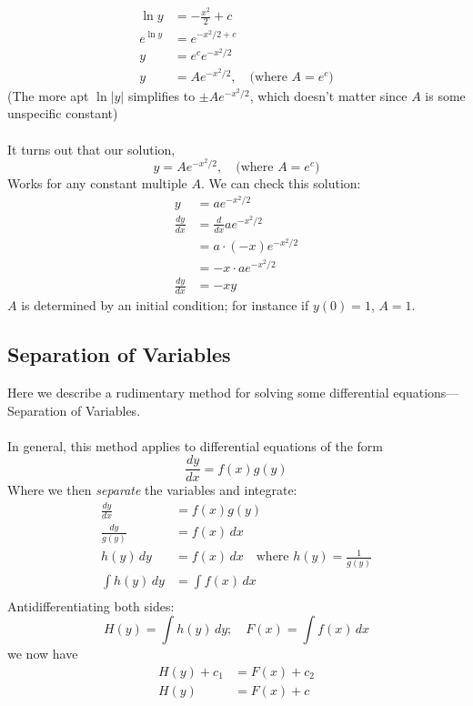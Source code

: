 \documentclass{report}
\begin{document}
\begin{align*}
\ln y&=-\frac{x^2}{2}+c\\
e^{\ln y}&=e^{-x^2/2+c}\\
y&=e^ce^{-x^2/2}\\
y&=Ae^{-x^2/2},\quad\text{(where $A=e^c$})
\end{align*}
(The more apt $\ln|y|$ simplifies to $\pm Ae^{-x^2/2}$, which doesn't matter since $A$ is some
unspecific constant)\\
\vspace{1mm}\\
It turns out that our solution,
\begin{equation*}
y=Ae^{-x^2/2},\quad\text{(where $A=e^c$})
\end{equation*}
Works for any constant multiple $A$. We can check this 
solution:
\begin{align*}
y&=ae^{-x^2/2}\\
\frac{dy}{dx}&=\frac{d}{dx}ae^{-x^2/2}\\
&=a\cdot(-x)e^{-x^2/2}\\
&=-x\cdot ae^{-x^2/2}\\
\frac{dy}{dx}&=-xy
\end{align*}
$A$ is determined by an initial condition; for instance if $y(0)=1$, $A=1$.
\newpage

\subsection{Separation of Variables} %
Here we describe a rudimentary method for solving some differential equations---\\Separation of Variables.\\
\vspace{1mm}\\
In general, this method applies to differential equations of the form
\begin{equation*}
\frac{dy}{dx}=f(x)g(y)
\end{equation*}
Where we then \textit{separate} the variables and integrate:
\begin{align*}
\frac{dy}{dx}&=f(x)g(y)\\
\frac{dy}{g(y)}&=f(x)\,dx\\
h(y)\,dy&=f(x)\,dx\quad\text{where }h(y)=\frac{1}{g(y)}\\
\int h(y)\,dy&=\int f(x)\,dx\\
\end{align*}
Antidifferentiating both sides:
\begin{equation*}
H(y)=\int h(y)\,dy;\quad F(x)=\int f(x)\,dx
\end{equation*}
we now have
\begin{align*}
H(y)+c_1&=F(x)+c_2\\
H(y)&=F(x)+c
\end{align*}
\newpage
\end{document}
